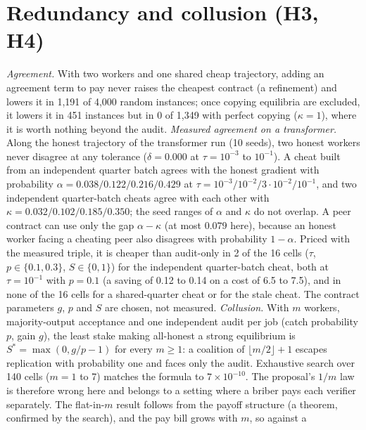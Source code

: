 \documentclass[sigconf,anonymous]{acmart}
\begin{document}
\section{Redundancy and collusion (H3, H4)}\label{sec:coll}
\emph{Agreement.} With two workers and one shared cheap trajectory, adding an agreement term to pay never raises the
cheapest contract (a refinement) and lowers it in 1,191 of 4,000 random instances; once copying equilibria are excluded,
it lowers it in 451 instances but in 0 of 1,349 with perfect copying ($\kappa=1$), where it is worth nothing beyond the
audit. \emph{Measured agreement on a transformer.} Along the honest trajectory of the transformer run (10 seeds), two
honest workers never disagree at any tolerance ($\delta=0.000$ at $\tau=10^{-3}$ to $10^{-1}$). A cheat built from an
independent quarter batch agrees with the honest gradient with probability $\alpha=0.038/0.122/0.216/0.429$ at
$\tau=10^{-3}/10^{-2}/3\cdot10^{-2}/10^{-1}$, and two independent quarter-batch cheats agree with each other with
$\kappa=0.032/0.102/0.185/0.350$; the seed ranges of $\alpha$ and $\kappa$ do not overlap. A peer contract can use only
the gap $\alpha-\kappa$ (at most $0.079$ here), because an honest worker facing a cheating peer also disagrees with
probability $1-\alpha$. Priced with the measured triple, it is cheaper than audit-only in 2 of the 16 cells ($\tau$, $p\in\{0.1,0.3\}$, $S\in\{0,1\}$) for the independent
quarter-batch cheat, both at $\tau=10^{-1}$ with $p=0.1$ (a saving of 0.12 to 0.14 on a cost of 6.5 to 7.5), and in
none of the 16 cells for a shared-quarter cheat or for the stale cheat. The contract parameters $g$, $p$
and $S$ are chosen, not measured. \emph{Collusion.} With $m$ workers, majority-output acceptance and one independent audit per job (catch
probability $p$, gain $g$), the least stake making all-honest a strong equilibrium is $S^{*}=\max(0,g/p-1)$ for every
$m\ge1$: a coalition of $\lfloor m/2\rfloor+1$ escapes replication with probability one and faces only the audit.
Exhaustive search over 140 cells ($m=1$ to 7) matches the formula to $7\times10^{-10}$. The proposal's $1/m$ law is
therefore wrong here and belongs to a setting where a briber pays each verifier separately. The flat-in-$m$ result
follows from the payoff structure (a theorem, confirmed by the search), and the pay bill grows with $m$, so against a
\end{document}
